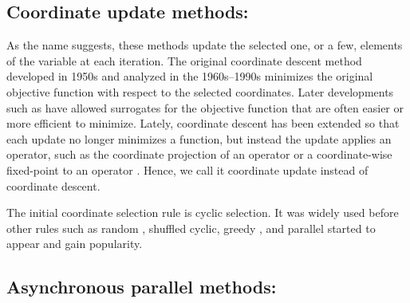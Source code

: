 \subsection*{Coordinate update methods:}
As the name suggests, these methods update the selected one, or a few, elements of the variable at each iteration. The original  coordinate descent method \citep{Hildreth1957_quadratic,Warga1963_minimizing,SargentSebastian1973_convergence,LuoTseng1992_convergence} developed in 1950s and analyzed in the 1960s--1990s minimizes the original objective function with respect to the selected coordinates. Later developments such as \citep{GrippoSciandrone2000_convergence,TsengYun2009_coordinate,TsengYun2009_blockcoordinate,XuYin2013_block,BolteSabachTeboulle2014_proximal} have allowed surrogates for the objective function that are often easier or more efficient to minimize. Lately, coordinate descent has been extended so that each update no longer minimizes a function, but instead the update applies an operator, such as the coordinate projection of an operator or a coordinate-wise fixed-point to an operator \citep{CombettesPesquet2015_stochastic,BianchiHachemFranck2014_stochastic,PengXuYanYin2015_arock,PengWuXuYanYin2016_coordinate}. Hence, we call it coordinate update instead of coordinate descent.

The initial coordinate selection rule  is cyclic selection. It was widely used before other rules such as random \citep{Nesterov2012_efficiency,RichtarikTakac2014_iteration,LuXiao2015_complexity}, shuffled cyclic, greedy \citep{BertsekasBertsekas1999_nonlinear,LiOsher2009_coordinate,TsengYun2009_coordinate,PengYanYin2013_parallel,NutiniSchmidtLaradjiFriedlanderKoepke2015_coordinate}, and parallel \citep{BradleyKyrolaBicksonGuestrin2011_parallel,richtarik2016parallel} started to appear and gain popularity.


\subsection*{Asynchronous parallel methods:}

